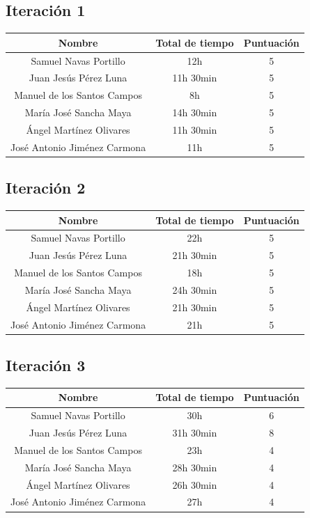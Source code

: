 \documentclass[11 pt]{book}
\begin{document}
		\subsection*{Iteración 1}
			\begin{tabular}{|c|c|c|}
				\hline
				Nombre & Total de tiempo & Puntuación\\
				\hline
				Samuel Navas Portillo & 12h & 5\\
				Juan Jesús Pérez Luna & 11h 30min & 5\\
				Manuel de los Santos Campos & 8h & 5\\
				María José Sancha Maya & 14h 30min & 5\\
				Ángel Martínez Olivares & 11h 30min & 5\\
				José Antonio Jiménez Carmona & 11h & 5\\
				\hline
			\end{tabular}
		
		\subsection*{Iteración 2}
			\begin{tabular}{|c|c|c|}
				\hline
				Nombre & Total de tiempo & Puntuación\\
				\hline
				Samuel Navas Portillo & 22h & 5\\
				Juan Jesús Pérez Luna & 21h 30min & 5\\
				Manuel de los Santos Campos & 18h & 5\\
				María José Sancha Maya & 24h 30min & 5\\
				Ángel Martínez Olivares & 21h 30min & 5\\
				José Antonio Jiménez Carmona & 21h & 5\\
				\hline
			\end{tabular}
			
		\subsection*{Iteración 3}			
			\begin{tabular}{|c|c|c|}
				\hline
				Nombre & Total de tiempo & Puntuación\\
				\hline
				Samuel Navas Portillo & 30h & 6\\
				Juan Jesús Pérez Luna & 31h 30min & 8\\
				Manuel de los Santos Campos & 23h & 4\\
				María José Sancha Maya & 28h 30min & 4\\
				Ángel Martínez Olivares & 26h 30min & 4\\
				José Antonio Jiménez Carmona & 27h & 4\\
				\hline
			\end{tabular}
			
\end{document}
